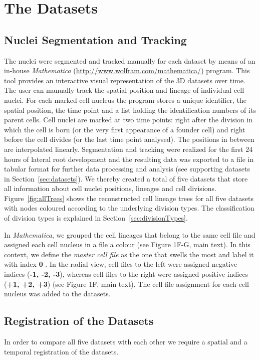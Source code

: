 \documentclass[11pt,a4paper, final]{article}
\begin{document}
\clearpage
\section{The Datasets}
\subsection{Nuclei Segmentation and Tracking}
\label{sec:segmentation}
\noindent
The nuclei were segmented and tracked manually for each dataset by means of an in-house \textit{Mathematica} (\href{http://www.wolfram.com/mathematica/}{http://www.wolfram.com/mathematica/}) program. This tool provides an interactive visual representation of the 3D datasets over time. The user can manually track the spatial position and lineage of individual cell nuclei. For each marked cell nucleus the program stores a unique identifier, the spatial position, the time point and a list holding the identification numbers of its parent cells. Cell nuclei are marked at two time points: right after the division in which the cell is born (or the very first appearance of a founder cell) and right before the cell divides (or the last time point analysed). The positions in between are interpolated linearly. Segmentation and tracking were realized for the first 24 hours of lateral root development and the resulting data was exported to a file in tabular format for further data processing and analysis (see supporting datasets in Section~\ref{sec:datasets}). We thereby created a total of five datasets that store all information about cell nuclei positions, lineages and cell divisions. Figure~\ref{fig:allTrees} shows the reconstructed cell lineage trees for all five datasets with nodes coloured according to the underlying division types. The classification of division types is explained in Section~\ref{sec:divisionTypes}.

In \textit{Mathematica}, we grouped the cell lineages that belong to the same cell file and assigned each cell nucleus in a file a colour (see Figure 1F-G, main text). In this context, we define the \textit{master cell file} as the one that swells the most and label it with index \textbf{0} \cite{Vermeer:2014fl}. In the radial view, cell files to the left were assigned negative indices (\textbf{-1, -2, -3}), whereas cell files to the right were assigned positive indices (\textbf{+1, +2, +3}) (see Figure 1F, main text). The cell file assignment for each cell nucleus was added to the datasets.

\subsection{Registration of the Datasets}
\label{sec:registration}
\noindent
In order to compare all five datasets with each other we require a spatial and a temporal registration of the datasets. 
\end{document}
